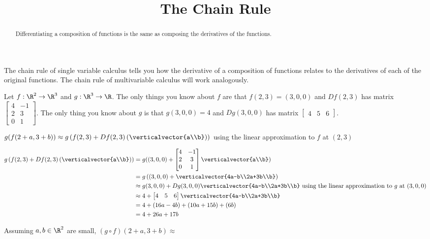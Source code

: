 \documentclass{ximera}
\title{The Chain Rule}
\begin{document}
\begin{abstract}
	Differentiating a composition of functions is the same as composing the derivatives of the functions.
\end{abstract}

The chain rule of single variable calculus tells you how the derivative of a composition of functions relates to the derivatives of each of the original functions.
The chain rule of multivariable calculus will work analogously.

\begin{question}
	Let $f:\R^2 \to \R^3$ and $g:\R^3 \to \R$.  The only things you know about $f$ are that $f(2,3) = (3,0,0)$ and $Df(2,3)$ 
	has matrix \(\begin{bmatrix}  4 & -1 \\2& 3\\ 0 &1\end{bmatrix}\).  The only thing you know about $g$ is that $g(3,0,0) = 4$ and $Dg(3,0,0)$ has matrix
	\(\begin{bmatrix} 4&5&6 \end{bmatrix}\).  
	\begin{solution}
		\begin{hint}
			$g(f(2+a,3+b)) \approx g\left(f(2,3)+Df(2,3)\left(\verticalvector{a\\b}\right)\right)$ using the linear approximation to $f$ at $(2,3)$ 
		\end{hint}
		\begin{hint}
			\begin{align*}
				g\left(f(2,3)+Df(2,3)\left(\verticalvector{a\\b}\right)\right) & = g((3,0,0)+\begin{bmatrix}  4 & -1 \\2& 3\\ 0 &1\end{bmatrix} \verticalvector{a\\b})\\
				&= g\left( (3,0,0)+ \verticalvector{4a-b\\2a+3b\\b}\right)\\
				&\approx g(3,0,0)+Dg(3,0,0)\verticalvector{4a-b\\2a+3b\\b} \text{ using the linear approximation to $g$ at $(3,0,0)$}\\
				&\approx 4+\begin{bmatrix} 4&5&6 \end{bmatrix}\verticalvector{4a-b\\2a+3b\\b}\\
				&=4+(16a-4b)+(10a+15b)+(6b)\\
				&=4+26a+17b
			\end{align*}
		\end{hint}
		Assuming $a,b \in \R^2$ are small,  $(g \circ f)(2+a,3+b) \approx$  
	\end{solution}
	

\end{question}
\end{document}
